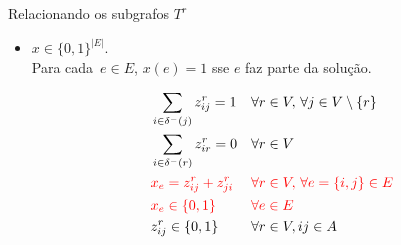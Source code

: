 \documentclass[dvipsnames]{beamer}
\newcommand{\espacoXBinary}{\{0,1\}^{|E|}}
\newcommand{\espacoZBinary}{\{0,1\}^{|E| \times |E|}}
\newcommand{\espacoBinary}{\{0,1\}}
\begin{document}
\begin{frame}{Relacionando os subgrafos $T^{r}$}
  \begin{itemize}
  \item $x \in \espacoXBinary$. \\
    Para cada~$e \in E$, \hbox{$x(e) = 1$} sse $e$ faz parte da solução.

    \begin{align}
      &\sum_{i \in \delta^{-}(j)}z^{r}_{ij} = 1 && \forall r \in V,\,\forall j \in V \setminus \{r\} \nonumber\\
      &\sum_{i \in \delta^{-}(r)}z^{r}_{ir} = 0 && \forall r \in V\nonumber\\
      &\textcolor{red}{x_{e} = z^{r}_{ij} + z^{r}_{ji}} && \textcolor{red}{\forall r \in V,\, \forall e = \{i,j\} \in E}\\
      &\textcolor{red}{x_e \in \espacoBinary} && \textcolor{red}{\forall e \in E}\\
      &z^{r}_{ij} \in \espacoBinary && \forall r \in V, ij \in A
    \end{align}
    
  \end{itemize}
\end{frame}
\end{document}
